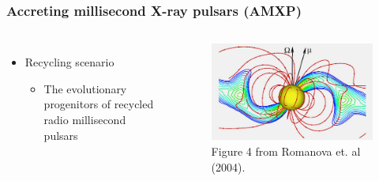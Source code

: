 \documentclass{beamer}
\begin{document}
\begin{frame}
\frametitle{Accreting millisecond X-ray pulsars (AMXP)}
\begin{columns}[c] %

\begin{itemize}
\item Recycling scenario
\begin{itemize}
\item The evolutionary progenitors of recycled radio millisecond pulsars%
\end{itemize}

\end{itemize}


\begin{figure}
\includegraphics[width=1.1\linewidth]{schematic.jpg}
\caption{Figure 4 from Romanova et. al (2004).}
\end{figure}

\end{columns}
\end{frame}

\end{document}
